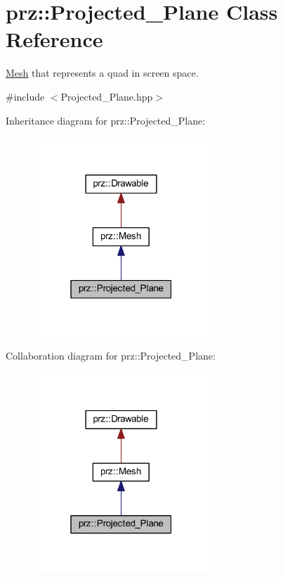 \hypertarget{classprz_1_1_projected___plane}{}\section{prz\+::Projected\+\_\+\+Plane Class Reference}
\label{classprz_1_1_projected___plane}


\mbox{\hyperlink{classprz_1_1_mesh}{Mesh}} that represents a quad in screen space.  




{\ttfamily \#include $<$Projected\+\_\+\+Plane.\+hpp$>$}



Inheritance diagram for prz\+::Projected\+\_\+\+Plane\+:
\nopagebreak
\begin{figure}[H]
\begin{center}
\leavevmode
\includegraphics[width=187pt]{classprz_1_1_projected___plane__inherit__graph}
\end{center}
\end{figure}


Collaboration diagram for prz\+::Projected\+\_\+\+Plane\+:
\nopagebreak
\begin{figure}[H]
\begin{center}
\leavevmode
\includegraphics[width=187pt]{classprz_1_1_projected___plane__coll__graph}
\end{center}
\end{figure}

